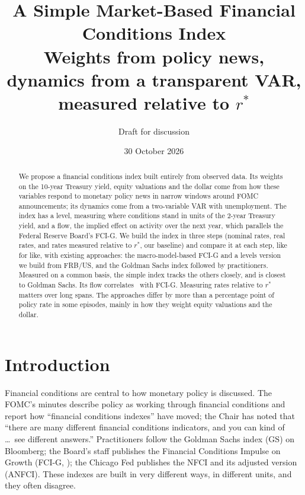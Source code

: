 \documentclass[11pt]{article}
\title{A Simple Market-Based Financial Conditions Index\\[4pt]\large Weights from policy news, dynamics from a transparent VAR, measured relative to $r^*$}
\author{Draft for discussion}
\date{30 October 2026}
\begin{document}
\maketitle

\begin{abstract}
\noindent We propose a financial conditions index built entirely from observed data. Its weights on the 10-year Treasury yield, equity valuations and the dollar come from how these variables respond to monetary policy news in narrow windows around FOMC announcements; its dynamics come from a two-variable VAR with unemployment. The index has a level, measuring where conditions stand in units of the 2-year Treasury yield, and a flow, the implied effect on activity over the next year, which parallels the Federal Reserve Board's FCI-G. We build the index in three steps (nominal rates, real rates, and rates measured relative to $r^*$, our baseline) and compare it at each step, like for like, with existing approaches: the macro-model-based FCI-G and a levels version we build from FRB/US, and the Goldman Sachs index followed by practitioners. Measured on a common basis, the simple index tracks the others closely, and is closest to Goldman Sachs. Its flow correlates \RstarFiFcig\ with FCI-G. Measuring rates relative to $r^*$ matters over long spans. The approaches differ by more than a percentage point of policy rate in some episodes, mainly in how they weight equity valuations and the dollar.
\end{abstract}

\section{Introduction}

Financial conditions are central to how monetary policy is discussed. The FOMC's minutes describe policy as working through financial conditions and report how ``financial conditions indexes'' have moved; the Chair has noted that ``there are many different financial conditions indicators, and you can kind of \ldots\ see different answers.'' Practitioners follow the Goldman Sachs index (GS) on Bloomberg; the Board's staff publishes the Financial Conditions Impulse on Growth (FCI-G, \citealt{ajello2023}); the Chicago Fed publishes the NFCI and its adjusted version (ANFCI). These indexes are built in very different ways, in different units, and they often disagree.
\end{document}
